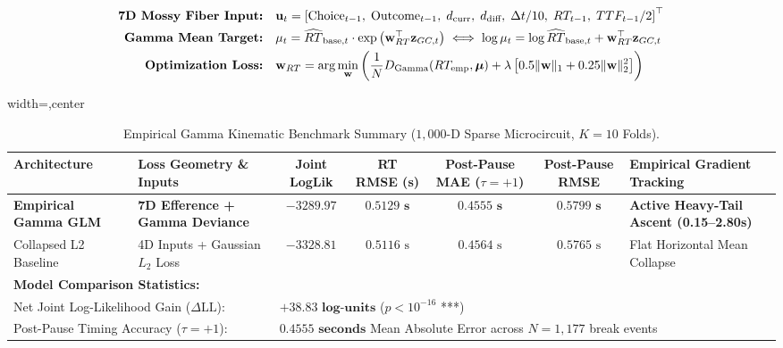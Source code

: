 \documentclass[11pt,twoside,a4paper]{article}
\begin{document}
\begin{align}
\text{\textbf{7D Mossy Fiber Input:}} \quad &\mathbf{u}_t = \left[ \text{Choice}_{t-1}, \; \text{Outcome}_{t-1}, \; d_{\text{curr}}, \; d_{\text{diff}}, \; \Delta t / 10, \; RT_{t-1}, \; TTF_{t-1} / 2 \right]^\top \\
\text{\textbf{Gamma Mean Target:}} \quad &\mu_t = \widehat{RT}_{\text{base}, t} \cdot \exp\left( \mathbf{w}_{RT}^\top \mathbf{z}_{GC, t} \right) \iff \log \mu_t = \log \widehat{RT}_{\text{base}, t} + \mathbf{w}_{RT}^\top \mathbf{z}_{GC, t} \\
\text{\textbf{Optimization Loss:}} \quad &\mathbf{w}_{RT} = \arg\min_{\mathbf{w}} \left( \frac{1}{N} D_{\text{Gamma}}(RT_{\text{emp}}, \boldsymbol{\mu}) + \lambda \left[ 0.5 \Vert\mathbf{w}\Vert_1 + 0.25 \Vert\mathbf{w}\Vert_2^2 \right] \right)
\end{align}

\begin{table}[H]
\centering
\caption{Empirical Gamma Kinematic Benchmark Summary ($1,000$-D Sparse Microcircuit, $K=10$ Folds).}
\label{tab:gamma_summary}
\vspace{0.4em}
\begin{adjustbox}{width=\textwidth,center}
\begin{tabular}{l l c c c c l}
\toprule
\textbf{Architecture} & \textbf{Loss Geometry \& Inputs} & \textbf{Joint LogLik} & \textbf{RT RMSE (s)} & \textbf{Post-Pause MAE ($\tau=+1$)} & \textbf{Post-Pause RMSE} & \textbf{Empirical Gradient Tracking} \\
\midrule
\textbf{Empirical Gamma GLM} & \textbf{7D Efference + Gamma Deviance} & $\mathbf{-3289.97}$ & $\mathbf{0.5129\text{ s}}$ & $\mathbf{0.4555\text{ s}}$ & $\mathbf{0.5799\text{ s}}$ & \textbf{Active Heavy-Tail Ascent (0.15--2.80s)} \\
Collapsed L2 Baseline & 4D Inputs + Gaussian $L_2$ Loss & $-3328.81$ & $0.5116\text{ s}$ & $0.4564\text{ s}$ & $0.5765\text{ s}$ & Flat Horizontal Mean Collapse \\
\midrule
\multicolumn{7}{l}{\textbf{Model Comparison Statistics:}} \\
\multicolumn{2}{l}{Net Joint Log-Likelihood Gain ($\Delta \text{LL}$):} & \multicolumn{5}{l}{$\mathbf{+38.83\text{ log-units}}$ ($p < 10^{-16}$ ***)} \\
\multicolumn{2}{l}{Post-Pause Timing Accuracy ($\tau = +1$):} & \multicolumn{5}{l}{$\mathbf{0.4555\text{ seconds}}$ Mean Absolute Error across $N=1,177$ break events} \\
\bottomrule
\end{tabular}
\end{adjustbox}
\end{table}
\end{document}
